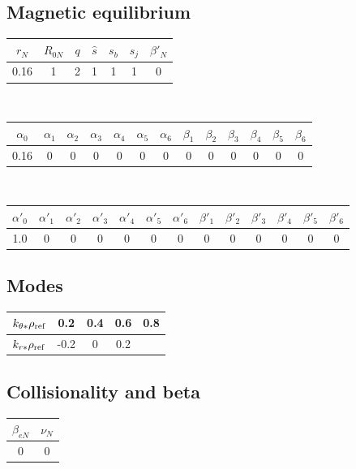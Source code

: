 \documentclass[a4paper]{report}
\begin{document}
\subsection{Magnetic equilibrium}
\begin{tabular}{c c c c c c c}
\hline
$r_N$ & $R_{0N}$ & $q$ & $\hat{s}$ & $s_b$ & $s_j$ & $\beta'_N$ \\ [0.5ex]
\hline
0.16 & 1 & 2 & 1 & 1 & 1 & 0 \\
\hline
\end{tabular}\\
\begin{tabular}{c c c c c c c c c c c c c}
\hline
$\alpha_0$ & $\alpha_1$ & $\alpha_2$ & $\alpha_3$ & $\alpha_4$ & $\alpha_5$ & $\alpha_6$ 
& $\beta_1$ & $\beta_2$ & $\beta_3$ & $\beta_4$ & $\beta_5$ & $\beta_6$   \\ [0.5ex]
\hline
 0.16 & 0 & 0 & 0 & 0 & 0 & 0 & 0 & 0 & 0 & 0 & 0 & 0 \\
\hline
\end{tabular}\\
\begin{tabular}{c c c c c c c c c c c c c}
\hline
$\alpha'_0$ & $\alpha'_1$ & $\alpha'_2$ & $\alpha'_3$ & $\alpha'_4$ & $\alpha'_5$ & $\alpha'_6$ 
& $\beta'_1$ & $\beta'_2$ & $\beta'_3$ & $\beta'_4$ & $\beta'_5$ & $\beta'_6$   \\ [0.5ex]
\hline
1.0 & 0 & 0 & 0 & 0 & 0  & 0 & 0 & 0 & 0  & 0 & 0 & 0 \\
\hline
\end{tabular}

\subsection{Modes}
\begin{tabular}{c c c c c}
\hline
$k_{\theta*}\rho_{\textrm{ref}}$ & 0.2 & 0.4 & 0.6 & 0.8 \\ [0.5ex]
\hline
$k_{r*}\rho_{\textrm{ref}}$ & -0.2 & 0  & 0.2  &  \\ [0.5ex]
\hline
\end{tabular}

\subsection{Collisionality and beta}
\begin{tabular}{c c}
\hline
 $\beta_{eN}$ & $\nu_N$ \\ [0.5ex]
\hline
0 & 0 \\ [0.5ex]
\hline
\end{tabular}
\end{document}
